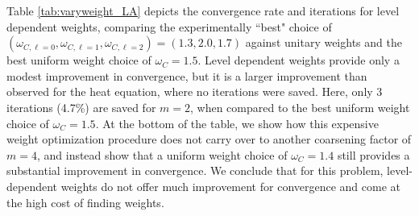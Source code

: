 \documentclass[VANCOUVER,STIX1COL]{WileyNJD-v2}
\begin{document}
Table \ref{tab:varyweight_LA} depicts the convergence rate and iterations for level dependent weights, 
comparing the experimentally ``best" choice of $(\omega_{C,\ell=0}, \omega_{C,\ell=1}, \omega_{C,\ell=2})=(1.3, 2.0, 1.7)$
against unitary weights and the best uniform weight choice of $\omega_C=1.5$.  Level dependent weights provide only a 
modest improvement in convergence, but it is a larger improvement than observed for the heat equation, where no iterations were 
saved.  Here, only 3 iterations (4.7\%) are saved for $m=2$, when compared to the best uniform weight choice of $\omega_C = 1.5$.
At the bottom of the table, we show how this expensive weight optimization procedure does not carry over to 
another coarsening factor of $m=4$, and instead show that a uniform weight choice of $\omega_C = 1.4$ still provides a 
substantial improvement in convergence.  We conclude that for this problem, level-dependent weights do not 
offer much improvement for convergence and come at the high cost of finding weights.
\end{document}
